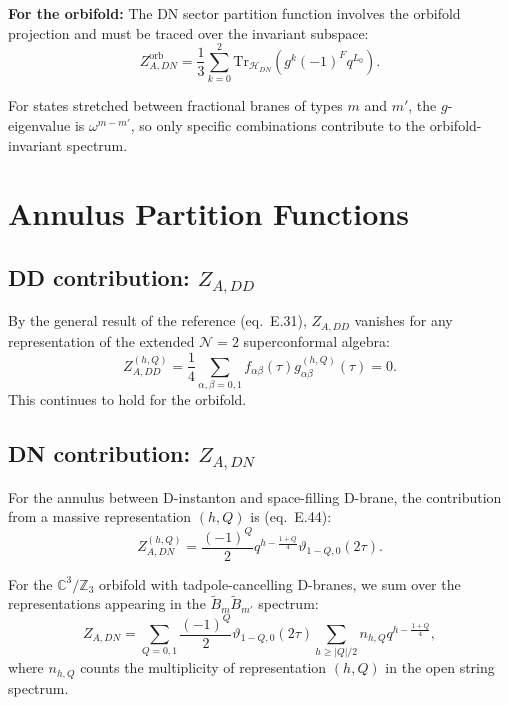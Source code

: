 \documentclass[11pt]{article}
\newcommand{\Z}{\mathbb{Z}}
\newcommand{\C}{\mathbb{C}}
\newcommand{\Tr}{\mathrm{Tr}}
\newcommand{\NN}{\mathcal{N}}
\begin{document}
\textbf{For the orbifold:} The DN sector partition function involves the orbifold projection and must be traced over the invariant subspace:
\begin{equation}
Z_{A,DN}^{\text{orb}} = \frac{1}{3} \sum_{k=0}^{2} \Tr_{\mathcal{H}_{DN}}(g^k (-1)^F q^{L_0}).
\end{equation}

For states stretched between fractional branes of types $m$ and $m'$, the $g$-eigenvalue is $\omega^{m-m'}$, so only specific combinations contribute to the orbifold-invariant spectrum.

\section{Annulus Partition Functions}

\subsection{DD contribution: $Z_{A,DD}$}

By the general result of the reference (eq.~E.31), $Z_{A,DD}$ vanishes for any representation of the extended $\NN=2$ superconformal algebra:
\begin{equation}
Z^{(h,Q)}_{A,DD} = \frac{1}{4} \sum_{\alpha,\beta=0,1} f_{\alpha\beta}(\tau) g^{(h,Q)}_{\alpha\beta}(\tau) = 0.
\end{equation}
This continues to hold for the orbifold.

\subsection{DN contribution: $Z_{A,DN}$}

For the annulus between D-instanton and space-filling D-brane, the contribution from a massive representation $(h,Q)$ is (eq.~E.44):
\begin{equation}
Z^{(h,Q)}_{A,DN} = \frac{(-1)^Q}{2} q^{h - \frac{1+Q}{4}} \vartheta_{1-Q,0}(2\tau).
\end{equation}

For the $\C^3/\Z_3$ orbifold with tadpole-cancelling D-branes, we sum over the representations appearing in the $\tilde{B}_m \tilde{B}_{m'}$ spectrum:
\begin{equation}
Z_{A,DN} = \sum_{Q=0,1} \frac{(-1)^Q}{2} \vartheta_{1-Q,0}(2\tau) \sum_{h \geq |Q|/2} n_{h,Q} q^{h - \frac{1+Q}{4}},
\end{equation}
where $n_{h,Q}$ counts the multiplicity of representation $(h,Q)$ in the open string spectrum.
\end{document}
